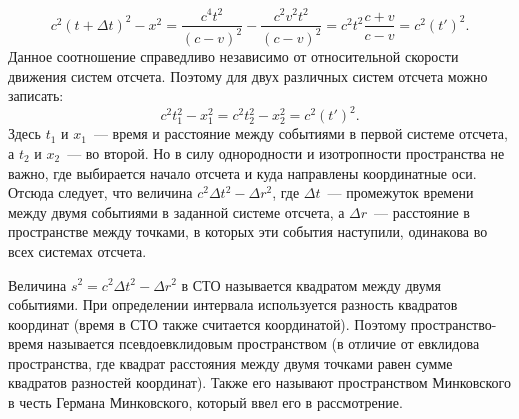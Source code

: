 \begin{equation}
c^2(t+\Delta t)^2-x^2=\frac{c^4 t^2}{(c-v)^2}-\frac{c^2 v^2 t^2}{(c-v)^2}=c^2 t^2 \frac{c+v}{c-v}=c^2(t')^2.
\end{equation}
Данное соотношение справедливо независимо от относительной скорости движения систем отсчета. Поэтому для двух различных систем отсчета можно записать: 
\begin{equation*}
	c^2t_1^2-x_1^2=c^2t_2^2-x_2^2=c^2(t')^2.
\end{equation*}
Здесь $t_1$ и $x_1$~--- время и расстояние между событиями в первой системе отсчета, а $t_2$ и $x_2$~--- во второй. Но в силу однородности и изотропности пространства не важно, где выбирается начало отсчета и куда направлены координатные оси. Отсюда следует, что величина $c^2\Delta t^2 - \Delta r^2$, где $\Delta t$~--- промежуток времени между двумя событиями в заданной системе отсчета, а $\Delta r$~--- расстояние в пространстве между точками, в которых эти события наступили, одинакова во всех системах отсчета.

Величина $s^2=c^2 \Delta t^2-\Delta r^2$ в СТО называется квадратом  между двумя событиями. При определении интервала используется разность квадратов координат (время в СТО также считается координатой). Поэтому пространство-время называется псевдоевклидовым пространством (в отличие от евклидова пространства, где квадрат расстояния между двумя точками равен сумме квадратов разностей координат). Также его называют пространством Минковского в честь Германа Минковского, который ввел его в рассмотрение.


